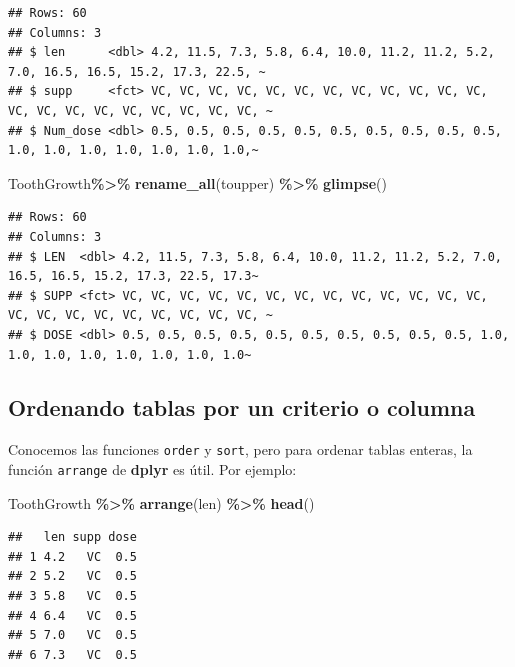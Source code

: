 \documentclass[
]{book}
\newenvironment{Shaded}{\begin{snugshade}}{\end{snugshade}}
\newcommand{\FunctionTok}[1]{\textcolor[rgb]{0.13,0.29,0.53}{\textbf{#1}}}
\newcommand{\NormalTok}[1]{#1}
\newcommand{\SpecialCharTok}[1]{\textcolor[rgb]{0.81,0.36,0.00}{\textbf{#1}}}
\begin{document}
\begin{verbatim}
## Rows: 60
## Columns: 3
## $ len      <dbl> 4.2, 11.5, 7.3, 5.8, 6.4, 10.0, 11.2, 11.2, 5.2, 7.0, 16.5, 16.5, 15.2, 17.3, 22.5, ~
## $ supp     <fct> VC, VC, VC, VC, VC, VC, VC, VC, VC, VC, VC, VC, VC, VC, VC, VC, VC, VC, VC, VC, VC, ~
## $ Num_dose <dbl> 0.5, 0.5, 0.5, 0.5, 0.5, 0.5, 0.5, 0.5, 0.5, 0.5, 1.0, 1.0, 1.0, 1.0, 1.0, 1.0, 1.0,~
\end{verbatim}

\begin{Shaded}
\begin{Highlighting}[]
\NormalTok{ToothGrowth}\SpecialCharTok{\%\textgreater{}\%} \FunctionTok{rename\_all}\NormalTok{(toupper) }\SpecialCharTok{\%\textgreater{}\%} \FunctionTok{glimpse}\NormalTok{()}
\end{Highlighting}
\end{Shaded}

\begin{verbatim}
## Rows: 60
## Columns: 3
## $ LEN  <dbl> 4.2, 11.5, 7.3, 5.8, 6.4, 10.0, 11.2, 11.2, 5.2, 7.0, 16.5, 16.5, 15.2, 17.3, 22.5, 17.3~
## $ SUPP <fct> VC, VC, VC, VC, VC, VC, VC, VC, VC, VC, VC, VC, VC, VC, VC, VC, VC, VC, VC, VC, VC, VC, ~
## $ DOSE <dbl> 0.5, 0.5, 0.5, 0.5, 0.5, 0.5, 0.5, 0.5, 0.5, 0.5, 1.0, 1.0, 1.0, 1.0, 1.0, 1.0, 1.0, 1.0~
\end{verbatim}

\hfill\break

\subsection{Ordenando tablas por un criterio o columna}\label{ordenando-tablas-por-un-criterio-o-columna-1}

\hfill\break
Conocemos las funciones \texttt{order} y \texttt{sort}, pero para ordenar tablas enteras, la función \texttt{arrange} de \textbf{dplyr} es útil.
Por ejemplo:

\begin{Shaded}
\begin{Highlighting}[]
\NormalTok{ToothGrowth }\SpecialCharTok{\%\textgreater{}\%} \FunctionTok{arrange}\NormalTok{(len) }\SpecialCharTok{\%\textgreater{}\%} \FunctionTok{head}\NormalTok{()}
\end{Highlighting}
\end{Shaded}

\begin{verbatim}
##   len supp dose
## 1 4.2   VC  0.5
## 2 5.2   VC  0.5
## 3 5.8   VC  0.5
## 4 6.4   VC  0.5
## 5 7.0   VC  0.5
## 6 7.3   VC  0.5
\end{verbatim}
\end{document}
